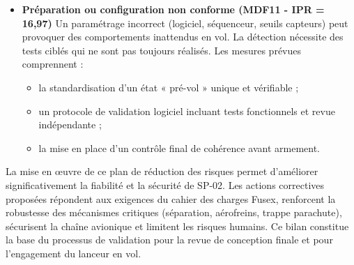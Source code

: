 \begin{itemize}
\begin{itemize}
        \item appliquer une vérification croisée systématique à deux opérateurs ;
        \item supprimer les configurations intermédiaires ambiguës lors de l’intégration.\\
    \end{itemize}
    \item \textbf{Préparation ou configuration non conforme (MDF11 - IPR = 16,97)} \newline
    Un paramétrage incorrect (logiciel, séquenceur, seuils capteurs) peut provoquer des comportements inattendus en vol. La
    détection nécessite des tests ciblés qui ne sont pas toujours réalisés. Les mesures prévues comprennent :
    \begin{itemize}
        \item la standardisation d’un état « pré-vol » unique et vérifiable ;
        \item un protocole de validation logiciel incluant tests fonctionnels et revue indépendante ;
        \item la mise en place d’un contrôle final de cohérence avant armement.
    \end{itemize}
\end{itemize}

La mise en œuvre de ce plan de réduction des risques permet d’améliorer significativement la fiabilité et la sécurité de SP-02.
Les actions correctives proposées répondent aux exigences du cahier des charges Fusex, renforcent la robustesse des mécanismes critiques (séparation, aérofreins, trappe parachute), sécurisent la chaîne avionique et limitent les risques humains.
Ce bilan constitue la base du processus de validation pour la revue de conception finale et pour l’engagement du lanceur en vol.



